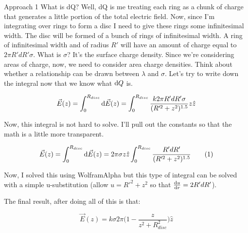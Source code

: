 \begin{homeworkProblem}
\begin{homeworkSection}{Approach 1}
        What is dQ? Well, dQ is me treating each ring as a chunk of
        charge that generates a little portion of the total electric
        field. Now, since I'm integrating over rings to form a disc I
        need to give these rings some infinitesimal width. The disc will
        be formed of a bunch of rings of infinitesimal width. A ring of
        infinitesimal width and of radius $R'$ will have an amount of
        charge equal to $2 \pi R' dR' \sigma$. What is $\sigma$? It's
        the surface charge density. Since we're considering areas of
        charge, now, we need to consider area charge densities. Think
        about whether a relationship can be drawn between $\lambda$ and
        $\sigma$. Let's try to write down the integral now that we know
        what $\mathop{}\!\mathrm{d} Q$ is.

        \[ \vec{E}(z) = \int_0^{R_{disc}} \mathop{}\!\mathrm{d} \vec{E}(z) =
        \int_0^{R_{disc}}\frac{k 2 \pi R' dR' \sigma}{(R'^2+z^2)^{1.5}}
        z\hat{z} \]

        Now, this integral is not hard to solve. I'll pull out the
        constants so that the math is a little more transparent. 
        
        \[ \vec{E}(z) = \int_0^{R_{disc}} \mathop{}\!\mathrm{d} \vec{E}(z) =
        2\pi \sigma z \hat{z} \int_0^{R_{disc}}\frac{R' dR'
        }{(R'^2+z^2)^{1.5}} \tag{1} \]
        
        Now, I solved this using WolframAlpha but this type of integral
        can be solved with a simple u-substitution (allow $u = R'^2 +
        z^2$ so that $\frac{\mathop{}\!\mathrm{d} u}{\mathop{}\!\mathrm{d} r} = 2 R' dR'$).

        The final result, after doing all of this is that:

        \[ \vec{E}(z) = k\sigma 2\pi \bigg( 1 - \frac{z}{z^2+R_{disc}^2}
        \bigg)\hat{z} \]



        

\end{homeworkSection}
\end{homeworkProblem}
